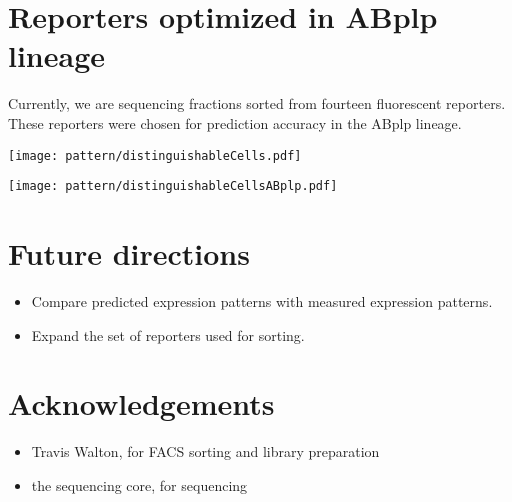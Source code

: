 \documentclass[landscape,a0]{a0poster}
\begin{document}
\begin{multicols}{4}
\begin{minipage}[b]{1\linewidth}
\end{minipage}

\columnbreak
\section*{Reporters optimized in ABplp lineage}

Currently, we are sequencing fractions sorted from fourteen fluorescent reporters.
These reporters were chosen for prediction accuracy in the ABplp lineage.

\texttt{[image: pattern/distinguishableCells.pdf]}

\begin{center}
\texttt{[image: pattern/distinguishableCellsABplp.pdf]}
\end{center}

\section*{Future directions}

\begin{itemize}

\item Compare predicted expression patterns with measured expression patterns.

\item Expand the set of reporters used for sorting.

\end{itemize}

\section*{Acknowledgements}

\begin{itemize}

\item Travis Walton, for FACS sorting and library preparation

\item the sequencing core, for sequencing

\end{itemize}




\end{multicols}
\end{document}
